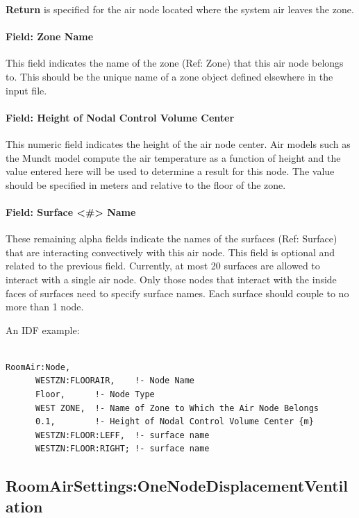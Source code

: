 \textbf{Return} is specified for the air node located where the system air leaves the zone.

\paragraph{Field: Zone Name}\label{field-zone-name-2-006}

This field indicates the name of the zone (Ref: Zone) that this air node belongs to. This should be the unique name of a zone object defined elsewhere in the input file.

\paragraph{Field: Height of Nodal Control Volume Center}\label{field-height-of-nodal-control-volume-center}

This numeric field indicates the height of the air node center. Air models such as the Mundt model compute the air temperature as a function of height and the value entered here will be used to determine a result for this node. The value should be specified in meters and relative to the floor of the zone.

\paragraph{Field: Surface \textless{}\#\textgreater{} Name}\label{field-surface-name-004}

These remaining alpha fields indicate the names of the surfaces (Ref: Surface) that are interacting convectively with this air node. This field is optional and related to the previous field. Currently, at most 20 surfaces are allowed to interact with a single air node. Only those nodes that interact with the inside faces of surfaces need to specify surface names. Each surface should couple to no more than 1 node.

An IDF example:

\begin{lstlisting}

RoomAir:Node,
      WESTZN:FLOORAIR,    !- Node Name
      Floor,      !- Node Type
      WEST ZONE,  !- Name of Zone to Which the Air Node Belongs
      0.1,        !- Height of Nodal Control Volume Center {m}
      WESTZN:FLOOR:LEFF,  !- surface name
      WESTZN:FLOOR:RIGHT; !- surface name
\end{lstlisting}

\subsection{RoomAirSettings:OneNodeDisplacementVentilation}\label{roomairsettingsonenodedisplacementventilation}

